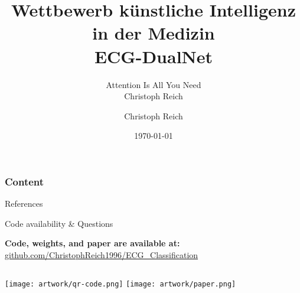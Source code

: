 \documentclass[
	english,
	aspectratio=169,
	color={accentcolor=10b},
	logo=true,
	colorframetitle=false,
	]{tudabeamer}
\title{Wettbewerb künstliche Intelligenz in der Medizin\\ ECG-DualNet}
\subtitle{Attention Is All You Need \\ \textmd{\small{Christoph Reich}}}
\author[C. Reich]{Christoph Reich}
\institute{KIS*MED}
\date{\today}
\begin{document}
    
    \maketitle
    
    \begin{frame}
    	\frametitle{Content}
    	{
        	\hypersetup{linkcolor=black}
        	\tableofcontents
    	}
    \end{frame}
    
    
    
    
    
    
    
    
    \begin{frame}[allowframebreaks]{References}
        
        
    \end{frame}
    
    \begin{frame}[c]{Code availability \& Questions}
        \begin{center}
            \begin{large}
                \textbf{Code, weights, and paper are available at:}
                \href{https://github.com/ChristophReich1996/ECG_Classification}{github.com/ChristophReich1996/ECG\_Classification}
            \end{large}
        \end{center}
        \begin{columns}
                \centering
                \texttt{[image: artwork/qr-code.png]}
                \centering
                \texttt{[image: artwork/paper.png]}
        \end{columns} 
    \end{frame}
    
    
\end{document}

